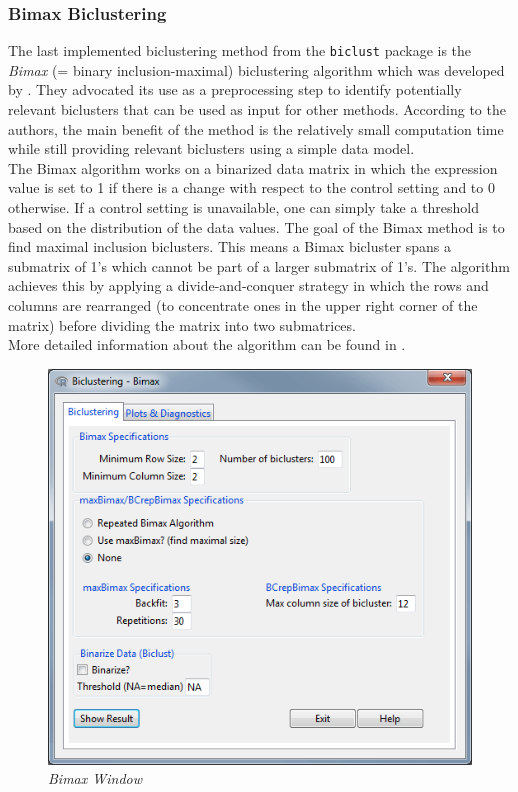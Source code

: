 \documentclass[a4paper]{article}\usepackage[]{graphicx}\usepackage[]{color}
\begin{document}
\subsubsection{Bimax Biclustering}
The last implemented biclustering method from the \verb|biclust| package is the
{\it Bimax} (= binary inclusion-maximal) biclustering algorithm which was developed
by \citet{Prelic2006}. They advocated its use as a preprocessing step
to identify potentially relevant biclusters that can be used as input for other
methods. According to the authors, the main benefit of the method is the
relatively small computation time while still providing relevant biclusters
using a simple data model. \\
The Bimax algorithm works on a binarized data matrix in which the expression
value is set to 1 if there is a change with respect to the control setting and
to 0 otherwise. If a control setting is unavailable, one can simply take a
threshold based on the distribution of the data values. The goal of the Bimax
method is to find maximal inclusion biclusters. This means a Bimax bicluster
spans a submatrix of 1's which cannot be part of a larger submatrix of 1's. The
algorithm achieves this by applying a divide-and-conquer strategy in which the
rows and columns are rearranged (to concentrate ones in the upper right corner
of the matrix) before dividing the matrix into two submatrices.\\
More detailed information about the algorithm can be found in \citet{Prelic2006}. 
\begin{figure}[H]
\centering
\includegraphics[scale=0.5]{figures/bimax_clusttab.png}
\caption{{\it Bimax Window}\label{bimax_clusttab}}
\end{figure}
\end{document}
